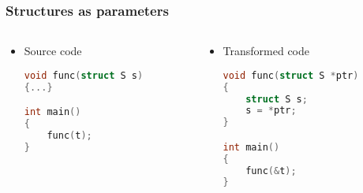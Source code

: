 \documentclass{beamer}
\begin{document}
\begin{frame}[fragile]
    \frametitle{Structures as parameters}

    \begin{columns}
        \begin{column}[]{0.4\textwidth}
            \begin{itemize}
                \item Source code
                      \begin{lstlisting}[language=C]
void func(struct S s)
{...}

int main()
{
    func(t);
}
                    \end{lstlisting}
            \end{itemize}

        \end{column}

        \begin{column}[]{0.5\textwidth}
            \begin{itemize}
                \item Transformed code
                      \begin{lstlisting}[language=C]
void func(struct S *ptr)
{
    struct S s;
    s = *ptr;
}

int main()
{
    func(&t);
}
                \end{lstlisting}
            \end{itemize}
        \end{column}
    \end{columns}

\end{frame}
\end{document}
